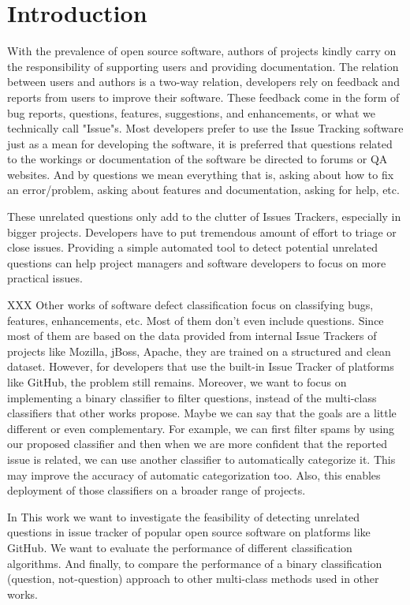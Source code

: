 \documentclass[conference]{IEEEtran}
\begin{document}
\section{Introduction}
With the prevalence of open source software, authors of projects kindly carry on 
the responsibility of supporting users and providing documentation. The relation 
between users and authors is a two-way relation, developers rely on feedback and reports from 
users to improve their software. These feedback come in the form of bug reports, questions, 
features, suggestions, and enhancements, or what we technically call "Issue"s. Most developers
prefer to use the Issue Tracking software just as a mean for developing the software, it is preferred 
that questions related to the workings or documentation of the software be directed to forums or QA
websites. And by questions we mean everything that is, asking about how to fix an error/problem, 
asking about features and documentation, asking for help, etc.

These unrelated questions only add to the clutter of Issues Trackers, especially in bigger projects.
Developers have to put tremendous amount of effort to triage or close issues. Providing a 
simple automated tool to detect potential unrelated questions can help project managers 
and software developers to focus on more practical issues.

XXX Other works of software defect classification focus on classifying bugs, 
features, enhancements, etc. Most of them don't even include questions. Since most of them are 
based on the data provided from internal Issue Trackers of projects like Mozilla, jBoss, Apache, they are
trained on a structured and clean dataset. However, for developers that use the built-in Issue Tracker
of platforms like GitHub, the problem still remains. Moreover, we want to focus on implementing 
a binary classifier to filter questions, instead of the multi-class classifiers that other 
works propose. Maybe we can say that the goals are a little different or even complementary. 
For example, we can first filter spams by using our proposed classifier and then when 
we are more confident that the reported issue is related, we can use another classifier to 
automatically categorize it. This may improve the accuracy of automatic categorization too. Also, this 
enables deployment of those classifiers on a broader range of projects.

In This work we want to investigate the feasibility of detecting unrelated questions
in issue tracker of popular open source software on platforms like GitHub. We want to evaluate the performance
of different classification algorithms. And finally, to compare the performance of a binary classification 
(question, not-question) approach to other multi-class methods used in other works.
\end{document}
